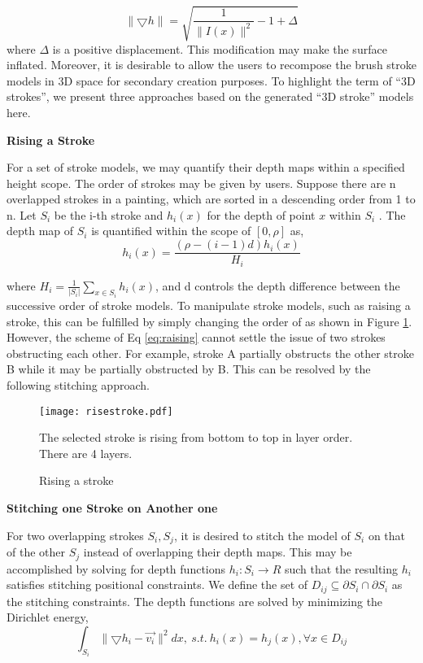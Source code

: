 \begin{equation}
\lVert \bigtriangledown h \rVert = \sqrt{\frac{1}{\lVert I(x) \rVert ^2}-1+ \Delta}
\end{equation}
where $\Delta$ is a positive displacement. This modification may make the surface inflated.
Moreover, it is desirable to allow the users to recompose the brush stroke models in 3D space for secondary creation purposes. To highlight the term of “3D strokes”, we present three approaches based on the generated “3D stroke” models here.\newline

\textbf{Rising a Stroke}  

For a set of stroke models, we may quantify their depth maps within a specified height scope. The order of strokes may be given by users. Suppose there are n overlapped strokes in a painting, which are sorted in a descending order from 1 to n. Let $S_i$ be the i-th stroke and $h_i(x)$ for the depth of point $x$ within $S_i$ . The depth map of $S_i$ is quantified within the scope of $[0,\rho]$ as,
\begin{equation}
h_i(x)= \frac{(\rho-(i-1)d)h_i(x)}{H_i}
\label{eq:raising}
\end{equation}

where $H_i=\frac{1}{\lvert S_i \rvert}\sum_{x\in S_i} h_i(x)  $, and d controls the depth difference between the successive order of stroke models. To manipulate stroke models, such as raising a stroke, this can be fulfilled by simply changing the order of  as shown in Figure \ref{raising}.
However, the scheme of Eq \ref{eq:raising} cannot settle the issue of two strokes obstructing each other. For example, stroke A partially obstructs the other stroke B while it may be partially obstructed by B. This can be resolved by the following stitching approach.\newline
\begin{figure}[H]
	\centering
	\texttt{[image: risestroke.pdf]}
	\caption{Rising a stroke}
	\label{raising}
	\medskip
	The selected stroke is rising from bottom to top in layer order. \\There are 4 layers.
\end{figure}

\textbf{Stitching one Stroke on Another one} 
\newline

For two overlapping strokes $S_i,S_j$, it is desired to stitch the model of $S_i$ on that of the other $S_j$ instead of overlapping their depth maps. This may be accomplished by solving for depth functions $h_i:S_i\rightarrow R $ such that the resulting $h_i$ satisfies stitching positional constraints. We define the set of $ D_{ij} \subseteq \partial S_i \cap \partial S_i $ as the stitching constraints. The depth functions are solved by minimizing the Dirichlet energy, 
\begin{equation}
 \int_{S_i} \lVert \bigtriangledown h_i - \vec{v_i} \rVert ^2 dx ,~ s.t. ~h_i(x)=h_j(x),\forall x \in D_{ij}
 \label{eq:stitch}
\end{equation}

